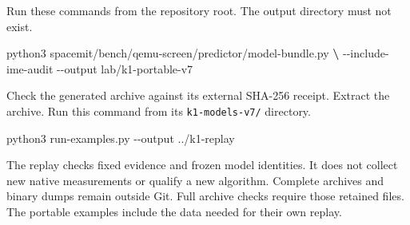 \documentclass[10pt,a4paper]{article}
\newenvironment{Shaded}{}{}
\newcommand{\ExtensionTok}[1]{#1}
\newcommand{\KeywordTok}[1]{\textcolor[rgb]{0.00,0.44,0.13}{\textbf{#1}}}
\newcommand{\NormalTok}[1]{#1}
\begin{document}
Run these commands from the repository root. The output directory must
not exist.

\begin{Shaded}
\begin{Highlighting}[]
\ExtensionTok{python3}\NormalTok{ spacemit/bench/qemu{-}screen/predictor/model{-}bundle.py }\KeywordTok{\textbackslash{}}
  \ExtensionTok{{-}{-}include{-}ime{-}audit}\NormalTok{ {-}{-}output lab/k1{-}portable{-}v7}
\end{Highlighting}
\end{Shaded}

Check the generated archive against its external SHA-256 receipt.
Extract the archive. Run this command from its \nolinkurl{k1-models-v7/}
directory.

\begin{Shaded}
\begin{Highlighting}[]
\ExtensionTok{python3}\NormalTok{ run{-}examples.py {-}{-}output ../k1{-}replay}
\end{Highlighting}
\end{Shaded}

The replay checks fixed evidence and frozen model identities. It does
not collect new native measurements or qualify a new algorithm. Complete
archives and binary dumps remain outside Git. Full archive checks
require those retained files. The portable examples include the data
needed for their own replay.
\end{document}
